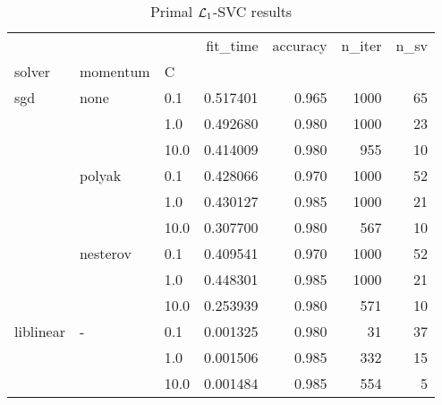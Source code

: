 \begin{table}[H]
\centering
\caption{Primal $\protect \mathcal{L}_1$-SVC results}
\label{primal_l1_svc_cv_results}
\begin{tabular}{lllrrrr}
\toprule
          &   &      &  fit\_time &  accuracy &  n\_iter &  n\_sv \\
solver & momentum & C &           &           &         &       \\
\midrule
sgd & none & 0.1  &  0.517401 &     0.965 &    1000 &    65 \\
          &   & 1.0  &  0.492680 &     0.980 &    1000 &    23 \\
          &   & 10.0 &  0.414009 &     0.980 &     955 &    10 \\
          & polyak & 0.1  &  0.428066 &     0.970 &    1000 &    52 \\
          &   & 1.0  &  0.430127 &     0.985 &    1000 &    21 \\
          &   & 10.0 &  0.307700 &     0.980 &     567 &    10 \\
          & nesterov & 0.1  &  0.409541 &     0.970 &    1000 &    52 \\
          &   & 1.0  &  0.448301 &     0.985 &    1000 &    21 \\
          &   & 10.0 &  0.253939 &     0.980 &     571 &    10 \\
liblinear & - & 0.1  &  0.001325 &     0.980 &      31 &    37 \\
          &   & 1.0  &  0.001506 &     0.985 &     332 &    15 \\
          &   & 10.0 &  0.001484 &     0.985 &     554 &     5 \\
\bottomrule
\end{tabular}
\end{table}

